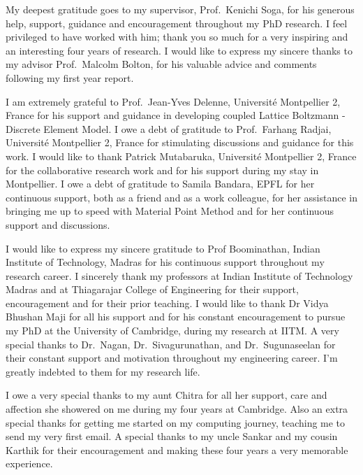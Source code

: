 
\begin{acknowledgements}      

My deepest gratitude goes to my supervisor, Prof.~Kenichi Soga, for his 
generous help, support, guidance and encouragement throughout my PhD research. 
I feel privileged to have worked with him; thank you so much for a very 
inspiring and an interesting four years of research. I would like to express my sincere thanks to my advisor Prof.~Malcolm Bolton, for his valuable advice and comments following my first year report.

I am extremely grateful to Prof.~Jean-Yves Delenne, Universit\'{e} Montpellier 
2, France for his support and guidance in developing coupled Lattice Boltzmann 
- Discrete Element Model. I owe a debt of gratitude to Prof.~Farhang Radjai, 
Universit\'{e} Montpellier 2, France for stimulating discussions and guidance 
for this work. I would like to thank Patrick Mutabaruka, Universit\'{e} 
Montpellier 2, France for the collaborative research work and for his support 
during my stay in Montpellier. I owe a debt of gratitude to Samila Bandara, 
EPFL for her continuous support, both as a friend and as a work colleague, for 
her assistance in bringing me up to speed with Material Point Method and for 
her continuous support and discussions.

I would like to express my sincere gratitude to Prof Boominathan, Indian 
Institute of Technology, Madras for his continuous support throughout my 
research career. I sincerely thank my professors at Indian Institute of 
Technology Madras and at Thiagarajar College of Engineering for their support, 
encouragement and for their prior teaching. I would like to thank Dr Vidya 
Bhushan Maji for all his support and for his constant encouragement to pursue 
my PhD at the University of Cambridge, during my research at IITM. A very 
special thanks to Dr.~Nagan, Dr.~Sivagurunathan, and Dr.~Sugunaseelan for their 
constant support and motivation throughout my engineering career. I'm greatly 
indebted to them for my research life.

I owe a very special thanks to my aunt Chitra for all her support, care and 
affection she showered on me during my four years at Cambridge. Also an extra 
special thanks for getting me started on my computing journey, teaching me to send my very first email. A special thanks to my uncle Sankar and my cousin Karthik for their encouragement and making these four years a very memorable 
experience.


\end{acknowledgements}
